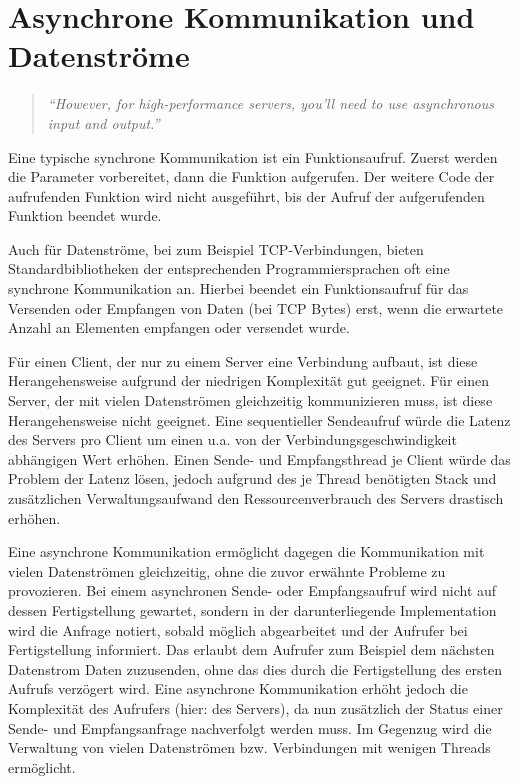 	
	
	


\section{Asynchrone Kommunikation und Datenströme}

\begin{quotation}
	\textit{\enquote{However, for high-performance servers, you'll need to use asynchronous input and output.}}
	\cite[454]{rust:orly_programming}
\end{quotation}

Eine typische synchrone Kommunikation ist ein Funktionsaufruf.
Zuerst werden die Parameter vorbereitet, dann die Funktion aufgerufen.
Der weitere Code der aufrufenden Funktion wird nicht ausgeführt, bis der Aufruf der aufgerufenden Funktion beendet wurde.

Auch für Datenströme, bei zum Beispiel TCP-Verbindungen, bieten Standardbibliotheken der entsprechenden Programmiersprachen oft eine synchrone Kommunikation an.
Hierbei beendet ein Funktionsaufruf für das Versenden oder Empfangen von Daten (bei TCP Bytes) erst, wenn die erwartete Anzahl an Elementen empfangen oder versendet wurde.

Für einen Client, der nur zu einem Server eine Verbindung aufbaut, ist diese Herangehensweise aufgrund der niedrigen Komplexität gut geeignet.
Für einen Server, der mit vielen Datenströmen gleichzeitig kommunizieren muss, ist diese Herangehensweise nicht geeignet.
Eine sequentieller Sendeaufruf würde die Latenz des Servers pro Client um einen u.a. von der Verbindungsgeschwindigkeit abhängigen Wert erhöhen.
Einen Sende- und Empfangsthread je Client würde das Problem der Latenz lösen, jedoch aufgrund des je Thread benötigten Stack und zusätzlichen Verwaltungsaufwand den Ressourcenverbrauch des Servers drastisch erhöhen.

Eine asynchrone Kommunikation ermöglicht dagegen die Kommunikation mit vielen Datenströmen gleichzeitig, ohne die zuvor erwähnte Probleme zu provozieren.
Bei einem asynchronen Sende- oder Empfangsaufruf wird nicht auf dessen Fertigstellung gewartet, sondern in der darunterliegende Implementation wird die Anfrage notiert, sobald möglich abgearbeitet und der Aufrufer bei Fertigstellung informiert.
Das erlaubt dem Aufrufer zum Beispiel dem nächsten Datenstrom Daten zuzusenden, ohne das dies durch die Fertigstellung des ersten Aufrufs verzögert wird.
Eine asynchrone Kommunikation erhöht jedoch die Komplexität des Aufrufers (hier: des Servers), da nun zusätzlich der Status einer Sende- und Empfangsanfrage nachverfolgt werden muss.
Im Gegenzug wird die Verwaltung von vielen Datenströmen bzw. Verbindungen mit wenigen Threads ermöglicht.

